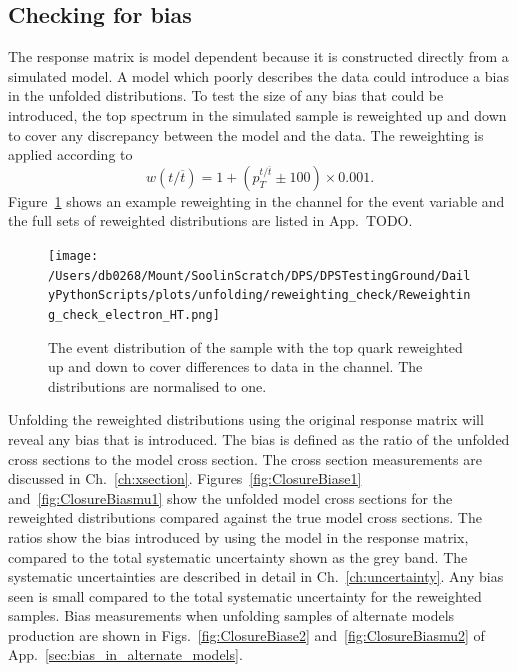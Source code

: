 
\subsection{Checking for bias} %
\label{sub:checking_for_bias}

The response matrix is model dependent because it is constructed directly from a simulated \ttbar{} model.
A model which poorly describes the data could introduce a bias in the unfolded distributions. 
To test the size of any bias that could be introduced, the top \pt{} spectrum in the simulated \powhegpythia{} sample is reweighted up and down to cover any discrepancy between the \powhegpythia{} model and the data.
The reweighting is applied according to
\begin{equation*}
w(t/\overline{t})=1+(p_{T}^{t/\overline{t}} \pm 100) \times 0.001.
\end{equation*}
Figure~\ref{fig:reweightExample} shows an example reweighting in the \eJets{} channel for the \HT{} event variable and the full sets of reweighted distributions are listed in App.~TODO.
\begin{figure}[htpb]
	\centering
	\texttt{[image: /Users/db0268/Mount/SoolinScratch/DPS/DPSTestingGround/DailyPythonScripts/plots/unfolding/reweighting\_check/Reweighting\_check\_electron\_HT.png]}
	\caption[The \HT{} event distribution of the \powhegpythia{} sample with the top quark \pt{} reweighted up and down to cover differences to data in the \eJets{} channel. The distributions are normalised to one.]{The \HT{} event distribution of the \powhegpythia{} sample with the top quark \pt{} reweighted up and down to cover differences to data in the \eJets{} channel. The distributions are normalised to one.}
	\label{fig:reweightExample}
\end{figure}

Unfolding the reweighted distributions using the original response matrix will reveal any bias that is introduced.
The bias is defined as the ratio of the unfolded cross sections to the model cross section.
The cross section measurements are discussed in Ch.~\ref{ch:xsection}.
Figures~\ref{fig:ClosureBiase1} and~\ref{fig:ClosureBiasmu1} show the unfolded model cross sections for the reweighted distributions compared against the true model cross sections.
The ratios show the bias introduced by using the \powhegpythia{} model in the response matrix, compared to the total systematic uncertainty shown as the grey band.
The systematic uncertainties are described in detail in Ch.~\ref{ch:uncertainty}.
Any bias seen is small compared to the total systematic uncertainty for the reweighted samples.
Bias measurements when unfolding samples of alternate models \ttbar{} production are shown in Figs.~\ref{fig:ClosureBiase2} and~\ref{fig:ClosureBiasmu2} of App.~\ref{sec:bias_in_alternate_models}.

% 

